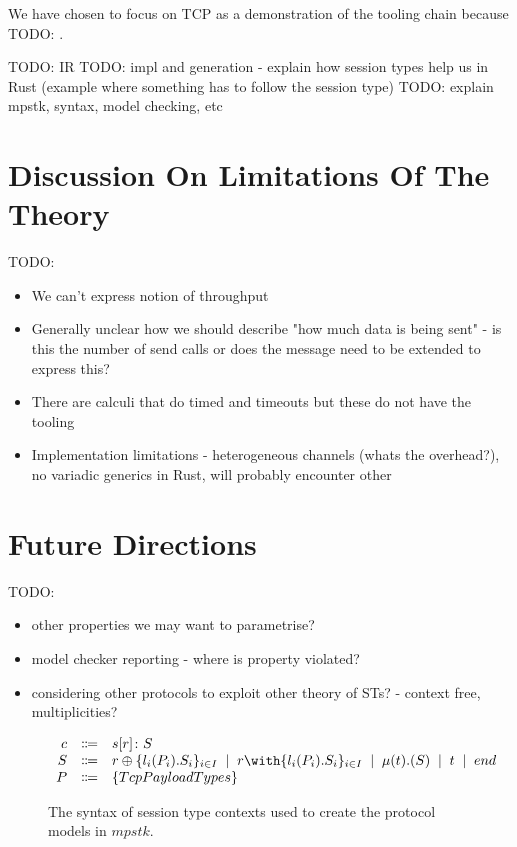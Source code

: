 \documentclass{article}
\newcommand{\todo}[1]{}
\renewcommand{\todo}[1]{{\color{red} TODO: {#1}}}
\newcommand{\sep}{\;\mid\;}
\begin{document}
We have chosen to focus on TCP as a demonstration of the tooling chain because \todo.

\todo{IR}
\todo{impl and generation - explain how session types help us in Rust (example where something has to follow the session type)}
\todo{explain mpstk, syntax, model checking, etc}

\section{Discussion On Limitations Of The Theory}

\todo{
    \begin{itemize}
        \item We can't express notion of throughput
        \item Generally unclear how we should describe "how much data is being sent" - is this the number of send calls or does the message need to be extended to express this?
        \item There are calculi that do timed and timeouts but these do not have the tooling
        \item Implementation limitations - heterogeneous channels (whats the overhead?), no variadic generics in Rust, will probably encounter other
    \end{itemize}
}

\section{Future Directions}

\todo{
    \begin{itemize}
        \item other properties we may want to parametrise?
        \item model checker reporting - where is property violated?
        \item considering other protocols to exploit other theory of STs? - context free, multiplicities?
    \end{itemize}
}


\begin{figure}[H]
    \centering
        $
        \begin{array}{rcl}
        \ensuremath{c}
            & \Coloneqq & \ensuremath{s[r] \colon S} \cr
        \ensuremath{S}
            & \Coloneqq & \ensuremath{r \oplus \{l_i(P_i).S_i\}_{i \in I}}
            \sep        \ensuremath{r \with \{l_i(P_i).S_i\}_{i \in I}}
            \sep        \ensuremath{\mu(t).(S)}
            \sep        \ensuremath{t}
            \sep        \ensuremath{end} \cr
        \ensuremath{P}
            & \Coloneqq & \ensuremath{\{TcpPayloadTypes\}}
        \end{array}
        $
    \caption{The syntax of session type contexts used to create the protocol models in \ensuremath{mpstk}.}
    \label{fig:syntax}
\end{figure}
\end{document}
